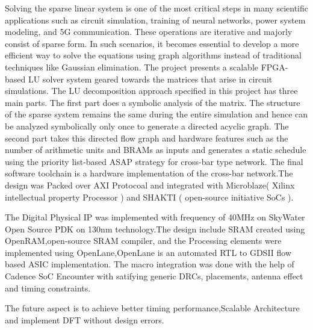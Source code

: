 \begin{Abstract}
\noindent
Solving the sparse linear system is one of the most critical steps in many scientific applications such as circuit simulation, training of neural networks, power system modeling, and 5G communication. These operations are iterative and majorly consist of sparse form. In such scenarios, it becomes essential to develop a more efficient way to solve the equations using graph algorithms instead of traditional techniques like Gaussian elimination. The project presents a scalable FPGA-based LU solver system geared towards the matrices that arise in circuit simulations. The LU decomposition approach specified in this project has three main parts. The first part does a symbolic analysis of the matrix. The structure of the sparse system remains the same during the entire simulation and hence can be analyzed symbolically only once to generate a directed acyclic graph. The second part takes this directed flow graph and hardware features such as the number of arithmetic units and BRAMs as inputs and generates a static schedule using the priority list-based ASAP strategy for cross-bar type network. The final software toolchain is a hardware implementation of the cross-bar network.The design was Packed over AXI Protocoal and integrated with Microblaze( Xilinx intellectual property Processor ) and SHAKTI ( open-source initiative SoCs ).

The Digital Physical IP was implemented with frequency of 40MHz on SkyWater Open Source PDK on 130nm technology.The design include SRAM created using OpenRAM,open-source SRAM compiler, and the Processing elements were implemented using OpenLane,OpenLane is an automated RTL to GDSII flow based ASIC implementation. The macro integration was done with the help of Cadence SoC Encounter with satifying generic DRCs, placements, antenna effect and timing constraints.

The future aspect is to achieve better timing performance,Scalable Architecture and implement DFT without design errors.


\end{Abstract}